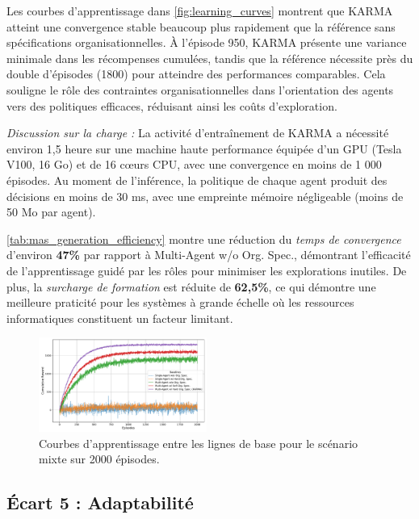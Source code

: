 Les courbes d'apprentissage dans \autoref{fig:learning_curves} montrent que KARMA atteint une convergence stable beaucoup plus rapidement que la référence sans spécifications organisationnelles. À l'épisode 950, KARMA présente une variance minimale dans les récompenses cumulées, tandis que la référence nécessite près du double d'épisodes (1800) pour atteindre des performances comparables. Cela souligne le rôle des contraintes organisationnelles dans l'orientation des agents vers des politiques efficaces, réduisant ainsi les coûts d'exploration.

\noindent \textit{Discussion sur la charge :} La activité d'entraînement de KARMA a nécessité environ 1,5 heure sur une machine haute performance équipée d'un GPU (Tesla V100, 16 Go) et de 16 cœurs CPU, avec une convergence en moins de 1 000 épisodes. Au moment de l'inférence, la politique de chaque agent produit des décisions en moins de 30 ms, avec une empreinte mémoire négligeable (moins de 50 Mo par agent).

\autoref{tab:mas_generation_efficiency} montre une réduction du \textit{temps de convergence} d'environ \textbf{47\%} par rapport à Multi-Agent w/o Org. Spec., démontrant l'efficacité de l'apprentissage guidé par les rôles pour minimiser les explorations inutiles. De plus, la \textit{surcharge de formation} est réduite de \textbf{62,5\%}, ce qui démontre une meilleure praticité pour les systèmes à grande échelle où les ressources informatiques constituent un facteur limitant.

\begin{figure}[h!]
  \centering
  \includegraphics[width=0.49\textwidth]{figures/learning_curves.pdf}
  \caption{Courbes d'apprentissage entre les lignes de base pour le scénario mixte sur 2000 épisodes.}
  \label{fig:learning_curves}
\end{figure}


\subsection{Écart 5 : Adaptabilité}

